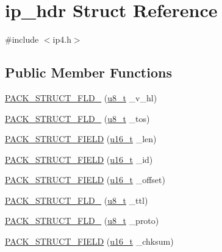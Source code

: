 \hypertarget{structip__hdr}{}\section{ip\+\_\+hdr Struct Reference}
\label{structip__hdr}


{\ttfamily \#include $<$ip4.\+h$>$}

\subsection*{Public Member Functions}
\begin{DoxyCompactItemize}
\item 
\hyperlink{structip__hdr_a2e9a57bb4e23ad0b3b9b949890b2607e}{P\+A\+C\+K\+\_\+\+S\+T\+R\+U\+C\+T\+\_\+\+F\+L\+D\+\_} (\hyperlink{group__compiler__abstraction_ga4caecabca98b43919dd11be1c0d4cd8e}{u8\+\_\+t} \+\_\+v\+\_\+hl)
\item 
\hyperlink{structip__hdr_a953cbb979026c774b58ea336959fdca6}{P\+A\+C\+K\+\_\+\+S\+T\+R\+U\+C\+T\+\_\+\+F\+L\+D\+\_} (\hyperlink{group__compiler__abstraction_ga4caecabca98b43919dd11be1c0d4cd8e}{u8\+\_\+t} \+\_\+tos)
\item 
\hyperlink{structip__hdr_aa3905f2613b3ce0994d3a04cf22ce2d7}{P\+A\+C\+K\+\_\+\+S\+T\+R\+U\+C\+T\+\_\+\+F\+I\+E\+LD} (\hyperlink{group__compiler__abstraction_ga77570ac4fcab86864fa1916e55676da2}{u16\+\_\+t} \+\_\+len)
\item 
\hyperlink{structip__hdr_a6d3aca5e6bdd354c377836c67d93575b}{P\+A\+C\+K\+\_\+\+S\+T\+R\+U\+C\+T\+\_\+\+F\+I\+E\+LD} (\hyperlink{group__compiler__abstraction_ga77570ac4fcab86864fa1916e55676da2}{u16\+\_\+t} \+\_\+id)
\item 
\hyperlink{structip__hdr_a2c93d9f414cb5e3bd727799393b3688a}{P\+A\+C\+K\+\_\+\+S\+T\+R\+U\+C\+T\+\_\+\+F\+I\+E\+LD} (\hyperlink{group__compiler__abstraction_ga77570ac4fcab86864fa1916e55676da2}{u16\+\_\+t} \+\_\+offset)
\item 
\hyperlink{structip__hdr_afbce37d4a49ca634d234158f0e0783ee}{P\+A\+C\+K\+\_\+\+S\+T\+R\+U\+C\+T\+\_\+\+F\+L\+D\+\_} (\hyperlink{group__compiler__abstraction_ga4caecabca98b43919dd11be1c0d4cd8e}{u8\+\_\+t} \+\_\+ttl)
\item 
\hyperlink{structip__hdr_a28e5be553013157549c28a6bfab2eb41}{P\+A\+C\+K\+\_\+\+S\+T\+R\+U\+C\+T\+\_\+\+F\+L\+D\+\_} (\hyperlink{group__compiler__abstraction_ga4caecabca98b43919dd11be1c0d4cd8e}{u8\+\_\+t} \+\_\+proto)
\item 
\hyperlink{structip__hdr_a620275dbd7f7b8f02cf3f90fa035eb62}{P\+A\+C\+K\+\_\+\+S\+T\+R\+U\+C\+T\+\_\+\+F\+I\+E\+LD} (\hyperlink{group__compiler__abstraction_ga77570ac4fcab86864fa1916e55676da2}{u16\+\_\+t} \+\_\+chksum)

\end{DoxyCompactItemize}
